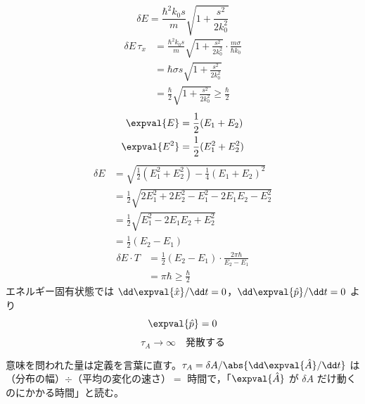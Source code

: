 \[ \delta E=\frac{\hbar^{2}k_{0}s}{m}\sqrt{1+\frac{s^{2}}{2k_{0}^{2}}} \]
\begin{align*}
\delta E\,\tau_{x}&=\frac{\hbar^{2}k_{0}s}{m}\sqrt{1+\frac{s^{2}}{2k_{0}^{2}}}\cdot\frac{m\sigma}{\hbar k_{0}}\\
&=\hbar\sigma s\sqrt{1+\frac{s^{2}}{2k_{0}^{2}}}\\
&=\frac{\hbar}{2}\sqrt{1+\frac{s^{2}}{2k_{0}^{2}}}\ge\frac{\hbar}{2}
\end{align*}
\begin{align*}
\expval{E}&=\frac{1}{2}(E_{1}+E_{2})\\
\expval{E^{2}}&=\frac{1}{2}(E_{1}^{2}+E_{2}^{2})
\end{align*}
\begin{align*}
\delta E&=\sqrt{\frac{1}{2}(E_{1}^{2}+E_{2}^{2})-\frac{1}{4}(E_{1}+E_{2})^{2}}\\
&=\frac{1}{2}\sqrt{2E_{1}^{2}+2E_{2}^{2}-E_{1}^{2}-2E_{1}E_{2}-E_{2}^{2}}\\
&=\frac{1}{2}\sqrt{E_{1}^{2}-2E_{1}E_{2}+E_{2}^{2}}\\
&=\frac{1}{2}(E_{2}-E_{1})
\end{align*}
\begin{align*}
\delta E\cdot T&=\frac{1}{2}(E_{2}-E_{1})\cdot\frac{2\pi\hbar}{E_{2}-E_{1}}\\
&=\pi\hbar\ge\frac{\hbar}{2}
\end{align*}
エネルギー固有状態では $\dd\expval{\hat{x}}/\dd t=0$，$\dd\expval{\hat{p}}/\dd t=0$ より
\[ \expval{\hat{p}}=0 \]
\[ \tau_{A}\to\infty\quad\text{発散する} \]
\item 意味を問われた量は定義を言葉に直す。$\tau_{A}=\delta A/\abs{\dd\expval{\hat{A}}/\dd t}$ は（分布の幅）$\div$（平均の変化の速さ）$=$ 時間で，「$\expval{\hat{A}}$ が $\delta A$ だけ動くのにかかる時間」と読む。
